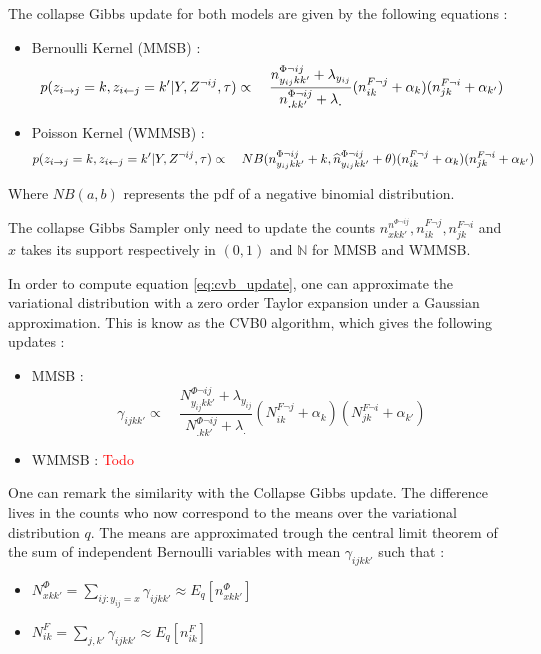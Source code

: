 

The collapse Gibbs update for both models are given by the following equations :

\begin{itemize}
    \item Bernoulli Kernel (MMSB) : \[p(z_{i\rightarrow j}=k, z_{i\leftarrow j}=k' | Y, Z^{\neg ij}, \tau) \propto \quad \frac{ n^{\Phi\neg ij}_{y_{ij}kk'} + \lambda_{y_{ij}}}{n^{\Phi\neg ij}_{\bm{.}kk'} + \lambda_{\bm{.}}} (n^{F\neg j}_{ik} + \alpha_k) (n^{F\neg i}_{jk} + \alpha_{k'})\]
    \item Poisson Kernel (WMMSB) : \[p(z_{i\rightarrow j}=k, z_{i\leftarrow j}=k' | Y, Z^{\neg ij}, \tau) \propto \quad  NB(n^{\Phi\neg ij}_{y_{ij}kk'} + k, \widehat{n}^{\Phi\neg ij}_{y_{ij}kk'} + \theta ) (n^{F\neg j}_{ik} + \alpha_k) (n^{F\neg i}_{jk} + \alpha_{k'})\]
\end{itemize}

Where $NB(a, b)$ represents the pdf of a negative binomial distribution.

The collapse Gibbs Sampler only need to update the counts $n^{n^{\Phi\neg ij}}_{xkk'}, n^{F\neg j}_{ik}, n^{F\neg i}_{jk}$ and $x$ takes its support respectively in $(0,1)$ and $\mathbb{N}$ for MMSB and WMMSB.

In order to compute equation \eqref{eq:cvb_update}, one can approximate the variational distribution with a zero order Taylor expansion under a Gaussian approximation. This is know as the CVB0 algorithm, which gives the following updates :

\begin{itemize}
    \item MMSB : \[ \gamma_{ijkk'} \propto \quad \frac{ N^{\Phi\neg ij}_{y_{ij}kk'} + \lambda_{y_{ij}}}{N^{\Phi\neg ij}_{\bm{.}kk'} + \lambda_{\bm{.}}} (N^{F\neg j}_{ik} + \alpha_k) (N^{F\neg i}_{jk} + \alpha_{k'})\]
    \item WMMSB : \textcolor{red}{Todo}
\end{itemize}

    One can remark the similarity with the Collapse Gibbs update. The difference lives in the counts who now correspond to the means over the variational distribution $q$. The means are approximated trough the central limit theorem of the sum of independent Bernoulli variables with mean $\gamma_{ijkk'}$ such that :
\begin{itemize}
    \item $N^{\Phi}_{xkk'} = \sum_{ij:y_{ij}=x} \gamma_{ijkk'}  \approx   E_q[n^{\Phi}_{xkk'}] $
    \item $N^{F}_{ik}  =  \sum_{j, k'} \gamma_{ijkk'} \approx   E_q[n^{F}_{ik}]$
\end{itemize}


